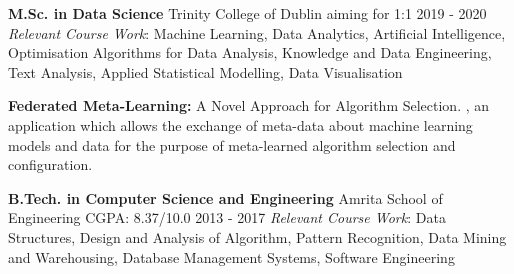 \begin{cventries}
  \cventry
    {\textbf{M.Sc. in Data Science}}
    {Trinity College of Dublin}
    {aiming for 1:1}
    {2019 - 2020}
    {\textit{Relevant Course Work}: Machine Learning, Data Analytics, Artificial Intelligence, Optimisation Algorithms for Data Analysis, Knowledge and Data Engineering, Text Analysis, Applied Statistical Modelling, Data Visualisation}
    
  \begin{cvskills}
    {\textbf{Federated Meta-Learning:} A Novel Approach for Algorithm Selection.}
    \cvskill{}
    {, an application which allows the exchange of meta-data about machine learning models and data for the purpose of meta-learned algorithm selection and configuration.}
  \end{cvskills}
  
  \cventry
    {\textbf{B.Tech. in Computer Science and Engineering}}
    {Amrita School of Engineering}
    {CGPA: 8.37/10.0}
    {2013 - 2017}
    {\textit{Relevant Course Work}: Data Structures, Design and Analysis of Algorithm, Pattern Recognition, Data Mining and Warehousing, Database Management Systems, Software Engineering}
\end{cventries}
